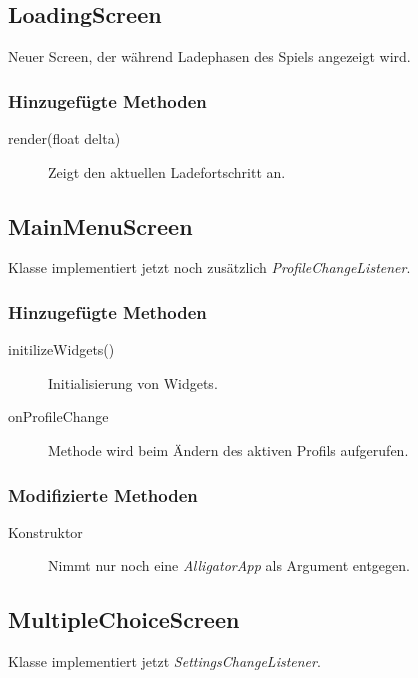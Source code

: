 \subsection{LoadingScreen}
Neuer Screen, der während Ladephasen des Spiels angezeigt wird.

\subsubsection{Hinzugefügte Methoden}
\begin{description}
\item[render(float delta)]
Zeigt den aktuellen Ladefortschritt an.


\end{description}



\subsection{MainMenuScreen}
Klasse implementiert jetzt noch zusätzlich \emph{ProfileChangeListener}.

\subsubsection{Hinzugefügte Methoden}
\begin{description}
\item[initilizeWidgets()]
Initialisierung von Widgets.
\item[onProfileChange]
Methode wird beim Ändern des aktiven Profils aufgerufen.
\end{description}

\subsubsection{Modifizierte Methoden}
\begin{description}
\item[Konstruktor]
Nimmt nur noch eine \emph{AlligatorApp} als Argument entgegen.

\end{description}


\subsection{MultipleChoiceScreen}
Klasse implementiert jetzt \emph{SettingsChangeListener}.

